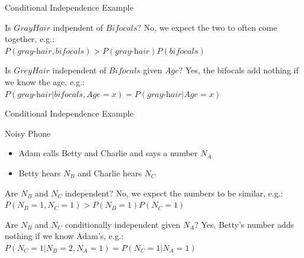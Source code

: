 \documentclass[14pt]{beamer}
\begin{document}
\begin{frame}{Conditional Independence Example}
	\begin{block}{Is $\textit{GrayHair}$ indpendent of $\textit{Bifocals}$?}
		\pause
		No, we expect the two to often come together, e.g.: \\[.5em]
		$P(\textit{gray-hair}, \textit{bifocals}) > P(\textit{gray-hair})P(\textit{bifocals})$
	\end{block}
	\pause
	\begin{block}{Is $\textit{GreyHair}$ independent of $\textit{Bifocals}$ given $\textit{Age}$?}
		\pause
		Yes, the bifocals add nothing if we know the age, e.g.: \\[.5em]
		$P(\textit{gray-hair}|\textit{bifocals},\textit{Age}=x) = P(\textit{gray-hair}|\textit{Age}=x)$
	\end{block}
\end{frame}
\begin{frame}{Conditional Independence Example}
	\begin{block}{Noisy Phone}
		\begin{itemize}
			\item Adam calls Betty and Charlie and says a number $N_{A}$
			\item Betty hears $N_{B}$ and Charlie hears $N_{C}$
		\end{itemize}
	\end{block}
	\pause
	\begin{block}{Are $N_{B}$ and $N_{C}$ independent?}
		\pause
		No, we expect the numbers to be similar, e.g.: \\[.5em]
		$P(N_{B}=1, N_{C}=1) > P(N_{B}=1)P(N_{C}=1)$
	\end{block}
	\pause
	\begin{block}{Are $N_{B}$ and $N_{C}$ conditionally independent given $N_{A}$?}
		\pause
		Yes, Betty's number adds nothing if we know Adam's, e.g.: \\[.5em]
		$P(N_{C}=1|N_{B}=2,N_{A}=1) = P(N_{C}=1|N_{A}=1)$
	\end{block}
\end{frame}
\end{document}
